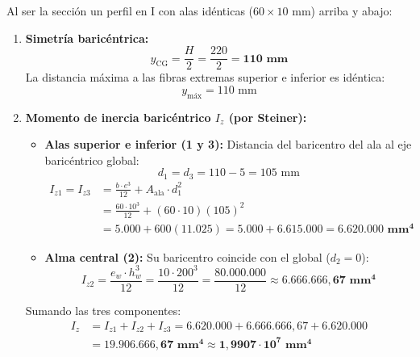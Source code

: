 Al ser la sección un perfil en I con alas idénticas ($60 \times 10\text{ mm}$) arriba y abajo:
\begin{enumerate}
    \item \textbf{Simetría baricéntrica:}
          \begin{equation}
              y_{\text{CG}} = \frac{H}{2} = \frac{220}{2} = \mathbf{110\text{ mm}}
          \end{equation}
          La distancia máxima a las fibras extremas superior e inferior es idéntica:
          \begin{equation}
              y_{\text{máx}} = 110\text{ mm}
          \end{equation}
    \item \textbf{Momento de inercia baricéntrico $I_z$ (por Steiner):}
          \begin{itemize}
              \item \textbf{Alas superior e inferior (1 y 3):}
                    Distancia del baricentro del ala al eje baricéntrico global:
                    \[
                        d_1 = d_3 = 110 - 5 = 105\text{ mm}
                    \]
                    \begin{align}
                        I_{z1} = I_{z3} & = \frac{b \cdot e^3}{12} + A_{\text{ala}} \cdot d_1^2 \nonumber \\
                                        & = \frac{60 \cdot 10^3}{12} + (60 \cdot 10)(105)^2 \nonumber \\
                        & = 5.000 + 600(11.025) = 5.000 + 6.615.000 = \mathbf{6.620.000\text{ mm}^4}
                    \end{align}
              \item \textbf{Alma central (2):}
                    Su baricentro coincide con el global ($d_2 = 0$):
                    \begin{equation}
                        I_{z2} = \frac{e_w \cdot h_w^3}{12} = \frac{10 \cdot 200^3}{12} = \frac{80.000.000}{12} \approx \mathbf{6.666.666{,}67\text{ mm}^4}
                    \end{equation}
          \end{itemize}
          Sumando las tres componentes:
          \begin{align}
              I_z & = I_{z1} + I_{z2} + I_{z3} = 6.620.000 + 6.666.666{,}67 + 6.620.000 \nonumber \\
                  & = \mathbf{19.906.666{,}67\text{ mm}^4 \approx 1{,}9907 \cdot 10^7\text{ mm}^4}
          \end{align}
\end{enumerate}

